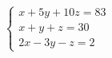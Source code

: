 \documentclass[crop]{standalone}
\begin{document}
$
\begin{cases}
  x + 5y + 10z = 83\\
  x + y + z = 30\\
  2x -3y - z = 2
\end{cases}
$
\end{document}
